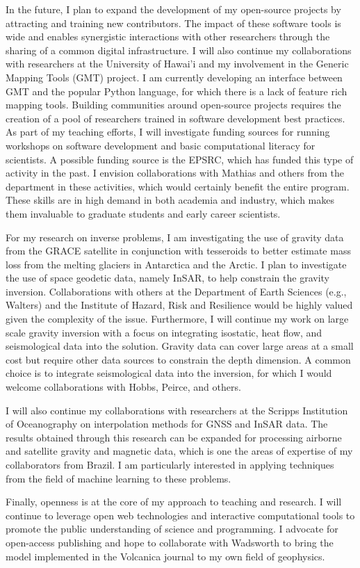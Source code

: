 \documentclass[12pt,notitlepage]{article}
\begin{document}
In the future, I plan to expand the development of my open-source projects by attracting
and training new contributors.
The impact of these software tools is wide and enables synergistic interactions with
other researchers through the sharing of a common digital infrastructure.
I will also continue my collaborations with researchers at the University of Hawai'i
and my involvement in the Generic Mapping Tools (GMT) project.
I am currently developing an interface between GMT and the popular Python language,
for which there is a lack of feature rich mapping tools.
Building communities around open-source projects requires the creation of a pool of
researchers trained in software development best practices.
As part of my teaching efforts, I will investigate funding sources for running workshops
on software development and basic computational literacy for scientists.
A possible funding source is the EPSRC, which has funded this type of activity in the
past.
I envision collaborations with Mathias and others from the department in these
activities, which would certainly benefit the entire program.
These skills are in high demand in both academia and industry, which makes them
invaluable to graduate students and early career scientists.

For my research on inverse problems, I am investigating the use of gravity data from the
GRACE satellite in conjunction with tesseroids to better estimate mass loss from the
melting glaciers in Antarctica and the Arctic.
I plan to investigate the use of space geodetic data, namely InSAR, to help constrain
the gravity inversion.
Collaborations with others at the Department of Earth Sciences (e.g., Walters) and the
Institute of Hazard, Risk and Resilience would be highly valued given the complexity of
the issue.
Furthermore, I will continue my work on large scale gravity inversion with a focus on
integrating isostatic, heat flow, and seismological data into the solution.
Gravity data can cover large areas at a small cost but require other data sources to
constrain the depth dimension.
A common choice is to integrate seismological data into the inversion, for which I would
welcome collaborations with Hobbs, Peirce, and others.

I will also continue my collaborations with researchers at the Scripps Institution of
Oceanography on interpolation methods for GNSS and InSAR data. The results obtained
through this research can be expanded for processing airborne and satellite gravity and
magnetic data, which is one the areas of expertise of my collaborators from Brazil.
I am particularly interested in applying techniques from the field of machine learning
to these problems.

Finally, openness is at the core of my approach to teaching and research.
I will continue to leverage open web technologies and interactive computational tools to
promote the public understanding of science and programming.
I advocate for open-access publishing and hope to collaborate with Wadsworth to bring
the model implemented in the Volcanica journal to my own field of geophysics.
\end{document}
